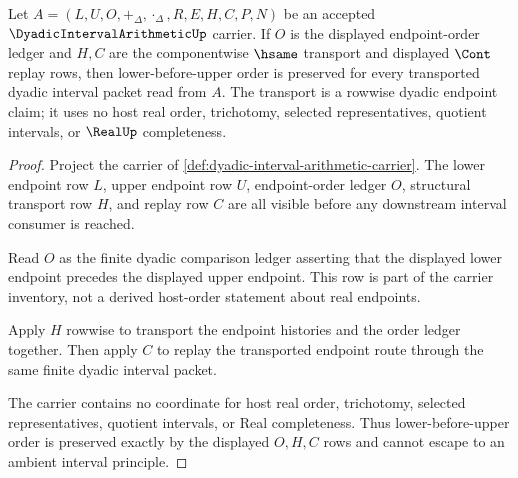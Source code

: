 \begin{theorem}
\label{thm:dyadic-interval-arithmetic-endpoint-order-transport}
Let $A=(L,U,O,+_\Delta,\cdot_\Delta,R,E,H,C,P,N)$ be an accepted $\DyadicIntervalArithmeticUp$ carrier. If $O$ is the displayed endpoint-order ledger and $H,C$ are the componentwise $\hsame$ transport and displayed $\Cont$ replay rows, then lower-before-upper order is preserved for every transported dyadic interval packet read from $A$. The transport is a rowwise dyadic endpoint claim; it uses no host real order, trichotomy, selected representatives, quotient intervals, or $\RealUp$ completeness.
\end{theorem}
\begin{proof}
Project the carrier of \autoref{def:dyadic-interval-arithmetic-carrier}. The lower endpoint row $L$, upper endpoint row $U$, endpoint-order ledger $O$, structural transport row $H$, and replay row $C$ are all visible before any downstream interval consumer is reached.

Read $O$ as the finite dyadic comparison ledger asserting that the displayed lower endpoint precedes the displayed upper endpoint. This row is part of the carrier inventory, not a derived host-order statement about real endpoints.

Apply $H$ rowwise to transport the endpoint histories and the order ledger together. Then apply $C$ to replay the transported endpoint route through the same finite dyadic interval packet.

The carrier contains no coordinate for host real order, trichotomy, selected representatives, quotient intervals, or Real completeness. Thus lower-before-upper order is preserved exactly by the displayed $O,H,C$ rows and cannot escape to an ambient interval principle.
\end{proof}

